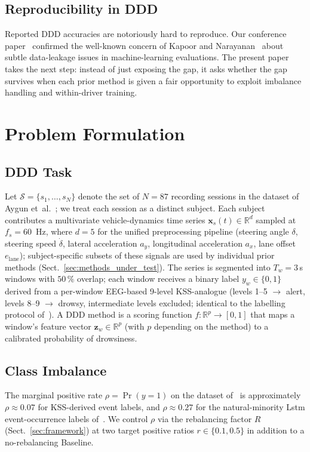 \documentclass[lettersize,journal]{IEEEtran}
\begin{document}
\subsection{Reproducibility in DDD}
Reported DDD accuracies are notoriously hard to reproduce.
Our conference paper~\cite{nakagama2025iv} confirmed the well-known concern of Kapoor and Narayanan~\cite{kapoor2023} about subtle data-leakage issues in machine-learning evaluations.
The present paper takes the next step: instead of just exposing the gap, it asks whether the gap survives when each prior method is given a fair opportunity to exploit imbalance handling and within-driver training.

\section{Problem Formulation}
\label{sec:formulation}

\subsection{DDD Task}\label{sec:ddd_overview}
Let $\mathcal{S} = \{s_1, \ldots, s_N\}$ denote the set of $N=87$ recording sessions in the dataset of Aygun et~al.~\cite{aygun2024}; we treat each session as a distinct subject.
Each subject contributes a multivariate vehicle-dynamics time series $\mathbf{x}_s(t) \in \mathbb{R}^d$ sampled at $f_s = 60$~Hz, where $d=5$ for the unified preprocessing pipeline (steering angle $\delta$, steering speed $\dot{\delta}$, lateral acceleration $a_y$, longitudinal acceleration $a_x$, lane offset $e_{\text{lane}}$); subject-specific subsets of these signals are used by individual prior methods (Sect.~\ref{sec:methods_under_test}).
The series is segmented into $T_w = 3$\,s windows with $50\,\%$ overlap; each window receives a binary label $y_w \in \{0,1\}$ derived from a per-window EEG-based 9-level KSS-analogue (levels 1--5 $\to$ alert, levels 8--9 $\to$ drowsy, intermediate levels excluded; identical to the labelling protocol of~\cite{nakagama2025iv}).
A DDD method is a scoring function $f \colon \mathbb{R}^p \to [0,1]$ that maps a window's feature vector $\mathbf{z}_w \in \mathbb{R}^p$ (with $p$ depending on the method) to a calibrated probability of drowsiness.

\subsection{Class Imbalance}\label{sec:class_imbalance}
The marginal positive rate $\rho = \Pr(y=1)$ on the dataset of~\cite{aygun2024} is approximately $\rho \approx 0.07$ for KSS-derived event labels, and $\rho \approx 0.27$ for the natural-minority Lstm event-occurrence labels of~\cite{wang2022}.
We control $\rho$ via the rebalancing factor $R$ (Sect.~\ref{sec:framework}) at two target positive ratios $r \in \{0.1, 0.5\}$ in addition to a no-rebalancing Baseline.
\end{document}
